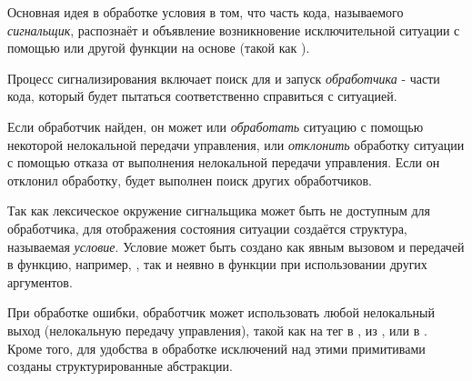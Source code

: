 Основная идея в обработке условия в том, что часть кода, называемого
\emph{сигнальщик}, распознаёт и объявление возникновение исключительной ситуации
с помощью  или другой функции на основе  (такой как
).

Процесс сигнализирования включает поиск для и запуск \emph{обработчика} - части
кода, который будет пытаться соответственно справиться с ситуацией.

Если обработчик найден, он может или \emph{обработать} ситуацию с помощью
некоторой нелокальной передачи управления, или \emph{отклонить} обработку
ситуации с помощью отказа от выполнения нелокальной передачи управления. Если он
отклонил обработку, будет выполнен поиск других обработчиков.

Так как лексическое окружение сигнальщика может быть не доступным для
обработчика, для отображения состояния ситуации создаётся структура, называемая
\emph{условие}. Условие может быть создано как явным вызовом
 и передачей в функцию, например, , так и неявно
в функции  при использовании других аргументов.

При обработке ошибки, обработчик может использовать любой нелокальный выход
(нелокальную передачу управления), такой как  на тег в ,
 из , или  в . Кроме того, для
удобства в обработке исключений над этими примитивами созданы структурированные
абстракции.

